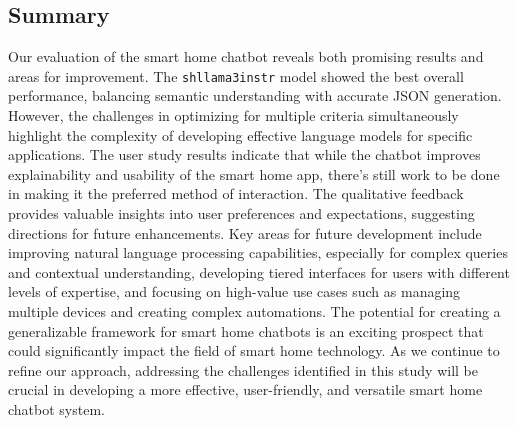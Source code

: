\subsection{Summary}
Our evaluation of the smart home chatbot reveals both promising results and areas for improvement. The \texttt{shllama3instr} model showed the best overall performance, balancing semantic understanding with accurate JSON generation. However, the challenges in optimizing for multiple criteria simultaneously highlight the complexity of developing effective language models for specific applications.
The user study results indicate that while the chatbot improves explainability and usability of the smart home app, there's still work to be done in making it the preferred method of interaction. The qualitative feedback provides valuable insights into user preferences and expectations, suggesting directions for future enhancements.
Key areas for future development include improving natural language processing capabilities, especially for complex queries and contextual understanding, developing tiered interfaces for users with different levels of expertise, and focusing on high-value use cases such as managing multiple devices and creating complex automations.
The potential for creating a generalizable framework for smart home chatbots is an exciting prospect that could significantly impact the field of smart home technology. As we continue to refine our approach, addressing the challenges identified in this study will be crucial in developing a more effective, user-friendly, and versatile smart home chatbot system.


